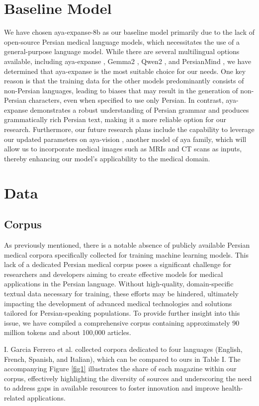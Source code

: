 \documentclass[conference]{IEEEtran}
\begin{document}
	\section{Baseline Model}
	We have chosen aya-expanse-8b as our baseline model primarily due to the lack of open-source Persian medical language models, which necessitates the use of a general-purpose language model. While there are several multilingual options available, including aya-expanse \cite{b5}, Gemma2 \cite{b15}, Qwen2 \cite{b16}, and PersianMind \cite{b17}, we have determined that aya-expanse is the most suitable choice for our needs. One key reason is that the training data for the other models predominantly consists of non-Persian languages, leading to biases that may result in the generation of non-Persian characters, even when specified to use only Persian. In contrast, aya-expanse demonstrates a robust understanding of Persian grammar and produces grammatically rich Persian text, making it a more reliable option for our research. Furthermore, our future research plans include the capability to leverage our updated parameters on aya-vision
	\cite{b18}
	, another model of aya family, which will allow us to incorporate medical images such as MRIs and CT scans as inputs, thereby enhancing our model’s applicability to the medical domain.
	\section{Data}
	
	\subsection{Corpus}
	As previously mentioned, there is a notable absence of publicly available Persian medical corpora specifically collected for training machine learning models. This lack of a dedicated Persian medical corpus poses a significant challenge for researchers and developers aiming to create effective models for medical applications in the Persian language. Without high-quality, domain-specific textual data necessary for training, these efforts may be hindered, ultimately impacting the development of advanced medical technologies and solutions tailored for Persian-speaking populations. To provide further insight into this issue, we have compiled a comprehensive corpus containing approximately 90 million tokens and about 100,000 articles. 
	
	I. Garcia Ferrero et al.
	\cite{b19}
	collected corpora dedicated to four languages (English, French, Spanish, and Italian), which can be compared to ours in Table I. The accompanying Figure \ref{fig1} illustrates the share of each magazine within our corpus, effectively highlighting the diversity of sources and underscoring the need to address gaps in available resources to foster innovation and improve health-related applications.
	
\end{document}
